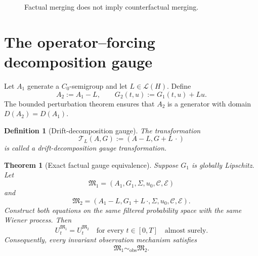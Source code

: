 \documentclass[11pt]{article}
\newtheorem{definition}[assumption]{Definition}
\newtheorem{theorem}[assumption]{Theorem}
\theoremstyle{remark}
\newcommand{\cL}{\mathcal L}
\newcommand{\cC}{\mathcal C}
\newcommand{\cM}{\mathfrak M}
\newcommand{\obs}{\mathrm{obs}}
\begin{document}
\begin{figure}[ht]
\centering
{}
\caption{Factual merging does not imply counterfactual merging.}
\label{fig:merge-split}
\end{figure}

\section{The operator--forcing decomposition gauge}

Let $A_1$ generate a $C_0$-semigroup and let $L\in\cL(H)$. Define
\begin{equation}\label{eq:gauge}
 A_2:=A_1-L,
 \qquad
 G_2(t,u):=G_1(t,u)+Lu.
\end{equation}
The bounded perturbation theorem ensures that $A_2$ is a generator with domain $D(A_2)=D(A_1)$.

\begin{definition}[Drift-decomposition gauge]
The transformation
\[
 \mathcal T_L(A,G):=(A-L,G+L\,\cdot)
\]
is called a drift-decomposition gauge transformation.
\end{definition}

\begin{theorem}[Exact factual gauge equivalence]\label{thm:gauge}
Suppose $G_1$ is globally Lipschitz. Let
\[
 \cM_1=(A_1,G_1,\Sigma,u_0,\cC,\mathcal E)
\]
and
\[
 \cM_2=(A_1-L,G_1+L\,\cdot,\Sigma,u_0,\cC,\mathcal E).
\]
Construct both equations on the same filtered probability space with the same Wiener process. Then
\[
 U_t^{\cM_1}=U_t^{\cM_2}
 \quad\text{for every }t\in[0,T]
 \quad\text{almost surely}.
\]
Consequently, every invariant observation mechanism satisfies
\[
 \cM_1\sim_{\obs}\cM_2.
\]
\end{theorem}
\end{document}

